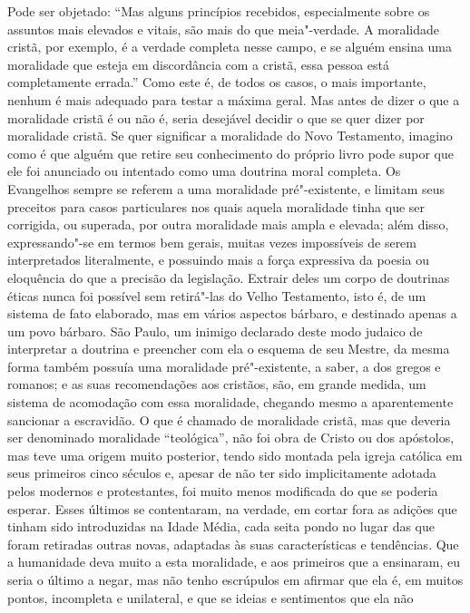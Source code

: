 Pode ser objetado: ``Mas alguns princípios recebidos, especialmente sobre
os assuntos mais elevados e vitais, são mais do que meia"-verdade. A
moralidade cristã, por exemplo, é a verdade completa nesse campo, e se
alguém ensina uma moralidade que esteja em discordância com a cristã,
essa pessoa está completamente errada.'' Como este é, de todos os
casos, o mais importante, nenhum é mais adequado para testar a máxima
geral. Mas antes de dizer o que a moralidade cristã é ou não é, seria
desejável decidir o que se quer dizer por moralidade cristã. Se quer
significar a moralidade do Novo Testamento, imagino como é que alguém
que retire seu conhecimento do próprio livro pode supor que ele foi
anunciado ou intentado como uma doutrina moral completa. Os
Evangelhos sempre se referem a uma moralidade pré"-existente, e limitam
seus preceitos para casos particulares nos quais aquela moralidade
tinha que ser corrigida, ou superada, por outra moralidade mais ampla e
elevada; além disso, expressando"-se em termos bem gerais, muitas vezes
impossíveis de serem interpretados literalmente, e possuindo mais a
força expressiva da poesia ou eloquência do que a precisão da legislação.
Extrair deles um corpo de doutrinas éticas nunca foi possível sem
retirá"-las do Velho Testamento, isto é, de um sistema de fato
elaborado, mas em vários aspectos bárbaro, e destinado apenas a um povo
bárbaro. São Paulo, um inimigo declarado deste modo judaico de
interpretar a doutrina e preencher com ela o esquema de seu Mestre, da
mesma forma também possuía uma moralidade pré"-existente, a saber, a
dos gregos e romanos; e as suas recomendações aos cristãos, são, em grande
medida, um sistema de acomodação com essa moralidade, chegando mesmo a
aparentemente sancionar a escravidão. O que é chamado de moralidade
cristã, mas que deveria ser denominado moralidade ``teológica'', não foi
obra de Cristo ou dos apóstolos, mas teve uma origem muito posterior,
tendo sido montada pela igreja católica em seus primeiros cinco séculos
e, apesar de não ter sido implicitamente adotada pelos modernos e
protestantes, foi muito menos modificada do que se poderia
esperar. Esses últimos se contentaram, na verdade, em cortar fora as
adições que tinham sido introduzidas na Idade Média, cada seita pondo
no lugar das que foram retiradas outras novas, adaptadas às suas
características e tendências. Que a humanidade deva muito a esta
moralidade, e aos primeiros que a ensinaram, eu seria o último a negar,
mas não tenho escrúpulos em afirmar que ela é, em muitos pontos,
incompleta e unilateral, e que se ideias e sentimentos que ela não
